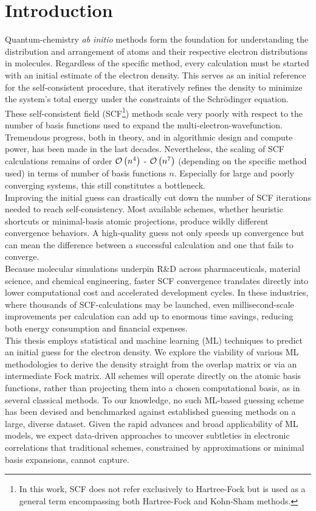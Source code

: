 \chapter{Introduction}
\label{sec:introduction}

Quantum-chemistry \textit{ab initio} methods form the foundation for understanding the distribution and arrangement of atoms and their respective electron distributions in molecules. Regardless of the specific method, every calculation must be started with an initial estimate of the electron density. This serves as an initial reference for the self-consistent procedure, that iteratively refines the density to minimize the system's total energy under the constraints of the Schrödinger equation. These self-consistent field (SCF\footnote{In this work, SCF does not refer exclusively to Hartree-Fock but is used as a general term encompassing both Hartree-Fock and Kohn-Sham methods.}) methods scale very poorly with respect to the number of basis functions used to expand the multi-electron-wavefunction. Tremendous progress, both in theory, and in algorithmic design and compute power, has been made in the last decades. Nevertheless, the scaling of SCF calculations remains of order $\mathcal{O}\left(n^4\right)$ - $\mathcal{O}\left(n^7\right)$ (depending on the specific method used) in terms of number of basis functions $n$. Especially for large and poorly converging systems, this still constitutes a bottleneck. \\

Improving the initial guess can drastically cut down the number of SCF iterations needed to reach self-consistency. Most available schemes, whether heuristic shortcuts or minimal-basis atomic projections, produce wildly different convergence behaviors. A high-quality guess not only speeds up convergence but can mean the difference between a successful calculation and one that fails to converge.\\
Because molecular simulations underpin R\&D across pharmaceuticals, material science, and chemical engineering, faster SCF convergence translates directly into lower computational cost and accelerated development cycles. In these industries, where thousands of SCF-calculations may be launched, even millisecond-scale improvements per calculation can add up to enormous time savings, reducing both energy consumption and financial expenses. \\

This thesis employs statistical and machine learning (ML) techniques to predict an initial guess for the electron density. We explore the viability of various ML methodologies to derive the density straight from the overlap matrix or via an intermediate Fock matrix. All schemes will operate directly on the atomic basis functions, rather than projecting them into a chosen computational basis, as in several classical methods. To our knowledge, no such ML-based guessing scheme has been devised and benchmarked against established guessing methods on a large, diverse dataset. Given the rapid advances and broad applicability of ML models, we expect data-driven approaches to uncover subtleties in electronic correlations that traditional schemes, constrained by approximations or minimal basis expansions, cannot capture.\\

